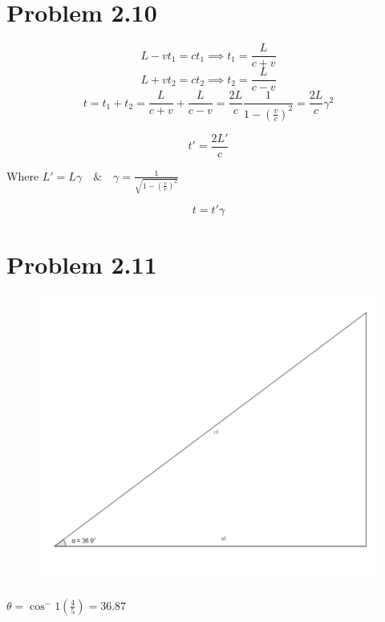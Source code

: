 \documentclass[12pt]{article}
\begin{document}
\newpage

\section{Problem 2.10}

\[L - vt_1 = ct_1 \implies t_1 = \frac{L}{c + v}\]
\[L + vt_2 = ct_2 \implies t_2 = \frac{L}{c - v}\]
\[t = t_1 + t_2 = \frac{L}{c + v} + \frac{L}{c - v} = \frac{2L}{c}\frac{1}{1-{(\frac{v}{c})}^2} = \frac{2L}{c} \gamma^2\]


\[
    t' = \frac{2L'}{c}
\]

Where \(L' = L \gamma\quad\&\quad\gamma = \frac{1}{\sqrt{1-{(\frac{v}{c})}^2}}\)

\[
    t = t' \gamma
\]

\newpage

\section{Problem 2.11}

\begin{figure}[H]
    \centering
    \includegraphics[scale=0.4]{Q5.png}
\end{figure}

\(\theta = \cos^-1(\frac{4}{5}) = 36.87\)

\newpage



\nocite{El-Deeb_PEU-453_Assignments}
\end{document}
